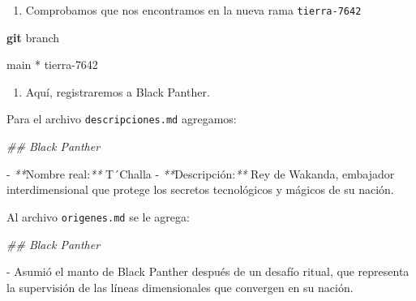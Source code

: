 \documentclass[
]{book}
\newenvironment{Shaded}{\begin{snugshade}}{\end{snugshade}}
\newcommand{\CommentTok}[1]{\textcolor[rgb]{0.56,0.35,0.01}{\textit{#1}}}
\newcommand{\ExtensionTok}[1]{#1}
\newcommand{\FunctionTok}[1]{\textcolor[rgb]{0.13,0.29,0.53}{\textbf{#1}}}
\newcommand{\NormalTok}[1]{#1}
\newcommand{\PreprocessorTok}[1]{\textcolor[rgb]{0.56,0.35,0.01}{\textit{#1}}}
\providecommand{\tightlist}{%
  \setlength{\itemsep}{0pt}\setlength{\parskip}{0pt}}
\begin{document}
\begin{enumerate}
\def\labelenumi{\arabic{enumi}.}
\setcounter{enumi}{1}
\tightlist
\item
  Comprobamos que nos encontramos en la nueva rama \texttt{tierra-7642}
\end{enumerate}

\begin{Shaded}
\begin{Highlighting}[]
\FunctionTok{git}\NormalTok{ branch}
\end{Highlighting}
\end{Shaded}

\begin{Shaded}
\begin{Highlighting}[]
  \ExtensionTok{main}
\ExtensionTok{*}\NormalTok{ tierra{-}7642}
\end{Highlighting}
\end{Shaded}

\begin{enumerate}
\def\labelenumi{\arabic{enumi}.}
\setcounter{enumi}{2}
\tightlist
\item
  Aquí, registraremos a Black Panther.
\end{enumerate}

Para el archivo \texttt{descripciones.md} agregamos:

\begin{Shaded}
\begin{Highlighting}[]

\CommentTok{\#\# Black Panther}

\ExtensionTok{{-}} \PreprocessorTok{**}\NormalTok{Nombre real:}\PreprocessorTok{**}\NormalTok{ T´Challa}
\ExtensionTok{{-}} \PreprocessorTok{**}\NormalTok{Descripción:}\PreprocessorTok{**}\NormalTok{ Rey de Wakanda, embajador interdimensional que protege los secretos tecnológicos y mágicos de su nación.}
\end{Highlighting}
\end{Shaded}

Al archivo \texttt{origenes.md} se le agrega:

\begin{Shaded}
\begin{Highlighting}[]

\CommentTok{\#\# Black Panther}

\ExtensionTok{{-}}\NormalTok{ Asumió el manto de Black Panther después de un desafío ritual, que representa la supervisión de las líneas dimensionales que convergen en su nación.}
\end{Highlighting}
\end{Shaded}
\end{document}

